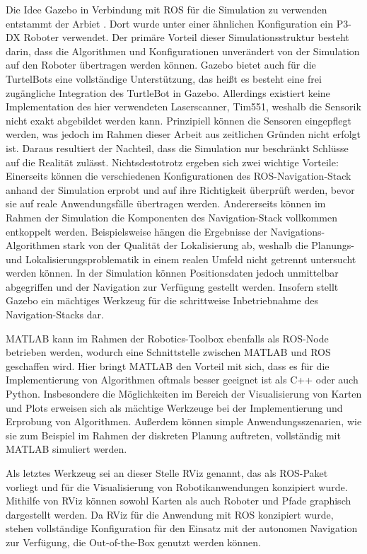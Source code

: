  Die Idee Gazebo in Verbindung mit ROS für die Simulation zu verwenden entstammt der Arbiet \cite{ROSGazebo}. Dort wurde unter einer ähnlichen Konfiguration ein P3-DX Roboter verwendet. Der primäre Vorteil dieser Simulationsstruktur besteht darin, dass die Algorithmen und Konfigurationen unverändert von der Simulation auf den Roboter übertragen werden können. Gazebo bietet auch für die TurtelBots eine vollständige Unterstützung, das heißt es besteht eine frei zugängliche Integration des TurtleBot in Gazebo. Allerdings existiert keine Implementation des hier verwendeten Laserscanner, Tim551, weshalb die Sensorik nicht exakt abgebildet werden kann. Prinzipiell können die Sensoren eingepflegt werden, was jedoch im Rahmen dieser Arbeit aus zeitlichen Gründen nicht erfolgt ist. Daraus resultiert der Nachteil, dass die Simulation nur beschränkt Schlüsse auf die Realität zulässt. Nichtsdestotrotz ergeben sich zwei wichtige Vorteile: Einerseits können die verschiedenen Konfigurationen des ROS-Navigation-Stack anhand der Simulation erprobt und auf ihre Richtigkeit überprüft werden, bevor sie auf reale Anwendungsfälle übertragen werden. Andererseits können im Rahmen der Simulation die Komponenten des Navigation-Stack vollkommen entkoppelt werden. Beispielsweise hängen die Ergebnisse der Navigations-Algorithmen stark von der Qualität der Lokalisierung ab, weshalb die Planungs- und Lokalisierungsproblematik in einem realen Umfeld nicht getrennt untersucht werden können. In der Simulation können Positionsdaten jedoch unmittelbar abgegriffen und der Navigation zur Verfügung gestellt werden. Insofern stellt Gazebo ein mächtiges Werkzeug für die schrittweise Inbetriebnahme des Navigation-Stacks dar.

MATLAB kann im Rahmen der Robotics-Toolbox ebenfalls als ROS-Node betrieben werden, wodurch eine Schnittstelle zwischen MATLAB und ROS geschaffen wird. Hier bringt MATLAB den Vorteil mit sich, dass es für die Implementierung von Algorithmen oftmals besser geeignet ist als C++ oder auch Python. Insbesondere die Möglichkeiten im Bereich der Visualisierung von Karten und Plots erweisen sich als mächtige Werkzeuge bei der Implementierung und Erprobung von Algorithmen. Außerdem können simple Anwendungsszenarien, wie sie zum Beispiel im Rahmen der diskreten Planung auftreten, vollständig mit MATLAB simuliert werden.

Als letztes Werkzeug sei an dieser Stelle RViz genannt, das als ROS-Paket vorliegt und für die Visualisierung von Robotikanwendungen konzipiert wurde. Mithilfe von RViz können sowohl Karten als auch Roboter und Pfade graphisch dargestellt werden. Da RViz für die Anwendung mit ROS konzipiert wurde, stehen vollständige Konfiguration für den Einsatz mit der autonomen Navigation zur Verfügung, die Out-of-the-Box genutzt werden können.